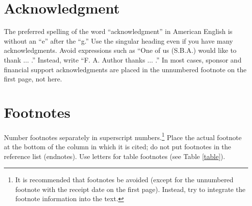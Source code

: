\documentclass[journal,twoside,web]{ieeecolor}
\begin{document}
\section*{Acknowledgment}

The preferred spelling of the word ``acknowledgment'' in American English is
without an ``e'' after the ``g.'' Use the singular heading even if you have
many acknowledgments. Avoid expressions such as ``One of us (S.B.A.) would
like to thank $\ldots$ .'' Instead, write ``F. A. Author thanks $\ldots$ .'' In most
cases, sponsor and financial support acknowledgments are placed in the
unnumbered footnote on the first page, not here.


\section*{Footnotes}
Number footnotes separately in superscript numbers.\footnote{It is recommended that footnotes be avoided (except for
    the unnumbered footnote with the receipt date on the first page). Instead,
    try to integrate the footnote information into the text.} Place the actual
footnote at the bottom of the column in which it is cited; do not put
footnotes in the reference list (endnotes). Use letters for table footnotes
(see Table \ref{table}).





\end{document}
